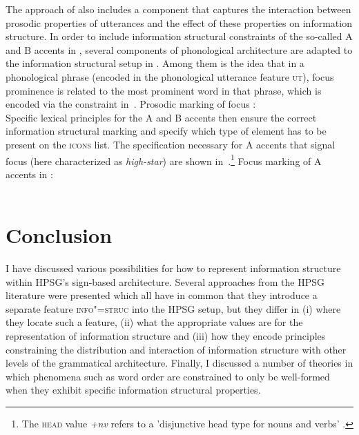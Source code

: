 \documentclass[output=paper,biblatex,babelshorthands,newtxmath,draftmode,colorlinks,citecolor=brown]{langscibook}
\begin{document}
The approach of \citet{song2018} also includes a component that
captures the interaction between prosodic properties of utterances and
the effect of these properties on information structure. In order to include
information structural constraints of the so-called A and B accents in
, several components of  phonological
architecture are adapted to the information structural setup in
\citet{song2018}. Among them is the idea that in a phonological phrase
(encoded in the phonological utterance feature \textsc{ut}), focus
prominence is related to the most prominent word in that phrase, which
is encoded via the constraint in~.
\ea
\label{ex:song-mkg}
Prosodic marking of focus \citep[159]{song2018}:\\
\z
Specific lexical principles for the A and B accents then ensure the
correct information structural marking and specify which type of
element has to be present on the \textsc{icons} list. The
specification necessary for  A accents that signal focus (here characterized as
\textit{high-star}) are shown
in~.\footnote{The \textsc{head} value \textit{+nv} refers to a 'disjunctive head type for nouns and verbs' \citep[159]{song2018}.}
\ea
\label{ex:song-a-accent}
Focus marking of A accents in  \citep[160]{song2018}:\\
 \impl\\
\z
{}

\section{Conclusion}
\label{sec:conclusion}

I have discussed various possibilities for how to represent
information structure within HPSG's sign-based architecture.
Several approaches from the HPSG literature were presented which all
have in common that they introduce a separate feature
\textsc{info"=struc} into the HPSG setup, but they differ in (i) where
they locate such a feature, (ii) what the appropriate values are for
the representation of information structure and (iii) how they encode
principles constraining the distribution and interaction of
information structure with other levels of the grammatical
architecture. Finally, I discussed a number of theories in which
phenomena such as word order are constrained to only be well-formed
when they exhibit specific information structural properties.
\end{document}
